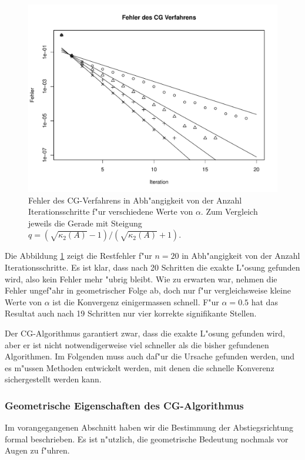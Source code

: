 \begin{beispiel}
\begin{figure}
\begin{center}
\includegraphics[width=\hsize]{graphics/cgresults.pdf}
\end{center}
\caption{Fehler des CG-Verfahrens in Abh"angigkeit von der Anzahl
Iterationsschritte f"ur verschiedene Werte von $\alpha$.
Zum Vergleich jeweils die Gerade mit Steigung
$q=(\sqrt{\kappa_2(A)}-1)/(\sqrt{\kappa_2(A)}+1)$.
\label{cg:example}}
\end{figure}
Die Abbildung \ref{cg:example} zeigt die Restfehler f"ur $n=20$
in Abh"angigkeit von der Anzahl Iterationsschritte.
Es ist klar, dass nach 20 Schritten die exakte L"osung gefunden wird, also
kein Fehler mehr "ubrig bleibt.
Wie zu erwarten war, nehmen die Fehler ungef"ahr in geometrischer Folge ab,
doch nur f"ur vergleichsweise kleine Werte von $\alpha$ ist die Konvergenz
einigermassen schnell.
F"ur $\alpha = 0.5$ hat das Resultat auch nach 19 Schritten nur vier
korrekte signifikante Stellen.
\end{beispiel}

Der CG-Algorithmus garantiert zwar, dass die exakte L"osung gefunden
wird, aber er ist nicht notwendigerweise viel schneller als die bisher
gefundenen Algorithmen.
Im Folgenden muss auch daf"ur die Ursache gefunden werden, und es m"ussen
Methoden entwickelt werden, mit denen die schnelle Konverenz sichergestellt
werden kann.

\subsubsection{Geometrische Eigenschaften des CG-Algorithmus}
Im vorangegangenen Abschnitt haben wir die Bestimmung der Abstiegsrichtung
formal beschrieben. Es ist n"utzlich, die geometrische Bedeutung nochmals
vor Augen zu f"uhren. 

